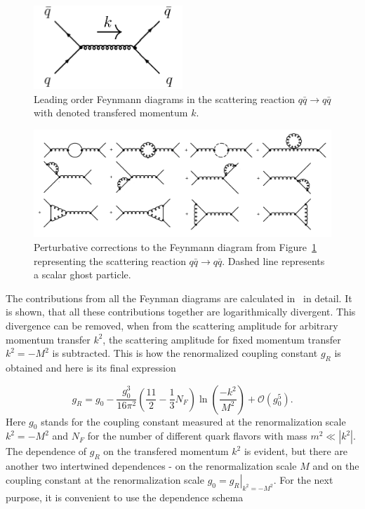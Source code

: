 \begin{figure}[t]
  \centering
  \includegraphics[width=0.5\textwidth]{Chapter1/QuarkQuarkScattering.png} 
  \caption{Leading order Feynmann diagrams in the scattering reaction $q \bar{q}
    \rightarrow q \bar{q}$ with denoted transfered momentum $k$.}
  \label{fig:QuarkQuarkScattering}
\end{figure}

\begin{figure}[t]
  \centering
  \includegraphics[width=\textwidth]{Chapter1/QuarkQuarkCorrection.png} 
  \caption{Perturbative corrections to the Feynmann diagram from
    Figure~\ref{fig:QuarkQuarkScattering} representing the scattering reaction
    $q \bar{q} \rightarrow q \bar{q}$. Dashed line represents a scalar ghost
    particle.}
  \label{fig:QuarkQuarkScatteringCorrection}
\end{figure}

The contributions from all the Feynman diagrams are calculated in~\cite{QCDTextbook}
in detail. It is shown, that all these contributions together are
logarithmically divergent. This divergence can be removed, when from the scattering
amplitude for arbitrary momentum transfer $k^2$, the scattering amplitude for fixed
momentum transfer $k^2 = -M^2$ is subtracted. This is how the renormalized
coupling constant $g_R$ is obtained and here is its final expression 

\begin{equation}
  g_R = g_0 - \frac{g_0^3}{16\pi^2} \left( \frac{11}{2} - \frac{1}{3}N_F \right)
  \ln \left( \frac{-k^2}{M^2} \right) + \mathscr{O}(g_0^5).
  \label{eq:RenormalizedCoupling}
\end{equation}
Here $g_0$ stands for the coupling constant measured at the renormalization scale
$k^2 = -M^2$ and $N_F$ for the number of different quark flavors with mass $m^2
\ll \left| k^2 \right|$. The dependence of $g_R$ on the transfered momentum $k^2$ is
evident, but there are another two intertwined dependences - on the renormalization
scale $M$ and on the coupling constant at the renormalization scale $g_0 =
\left. g_R \right|_{k^2=-M^2}$. For the next purpose, it is convenient to use the
dependence schema

